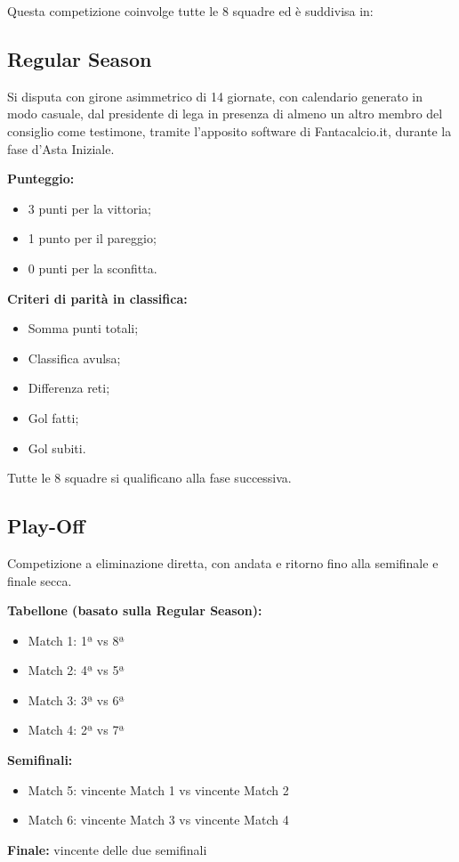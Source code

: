 \noindent Questa competizione coinvolge tutte le 8 squadre ed è suddivisa in:

\subsection{Regular Season}
\label{art:9.3.1}

Si disputa con girone asimmetrico di 14 giornate, con calendario generato in modo casuale, dal presidente di lega in presenza di almeno un altro membro del consiglio come testimone, tramite l'apposito software di Fantacalcio.it, durante la fase d'Asta Iniziale.

\noindent \textbf{Punteggio:}
\begin{itemize}
\item 3 punti per la vittoria;
\item 1 punto per il pareggio;
\item 0 punti per la sconfitta.
\end{itemize}

\noindent \textbf{Criteri di parità in classifica:}
\begin{itemize}
\item Somma punti totali;
\item Classifica avulsa;
\item Differenza reti;
\item Gol fatti;
\item Gol subiti.
\end{itemize}

\noindent
Tutte le 8 squadre si qualificano alla fase successiva.

\subsection{Play-Off}
\label{art:9.3.2}

Competizione a eliminazione diretta, con andata e ritorno fino alla semifinale e finale secca.

\noindent \textbf{Tabellone (basato sulla Regular Season):}
\begin{itemize}
    \item Match 1: 1ª vs 8ª
    \item Match 2: 4ª vs 5ª
    \item Match 3: 3ª vs 6ª
    \item Match 4: 2ª vs 7ª
\end{itemize}

\noindent
\textbf{Semifinali:} 
\begin{itemize}
    \item Match 5: vincente Match 1 vs vincente Match 2
    \item Match 6: vincente Match 3 vs vincente Match 4
\end{itemize}
\textbf{Finale:} vincente delle due semifinali

